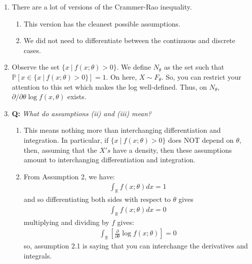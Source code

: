 \documentclass[11pt]{scrartcl}
\newcommand{\R}[0]{\mathbb{R}}
\theoremstyle{definition}
\theoremstyle{remark}
\newcommand{\pr}[1]{\mathbb{P}[#1]}
\newcommand{\idx}[2]{\int_{#1}^{#2}}
\begin{document}
\begin{enumerate}[noitemsep]
	\item There are a lot of versions of the Crammer-Rao inequality. 
	\begin{enumerate}[noitemsep]
		\item This version has the cleanest possible assumptions. 
		\item We did not need to differentiate between the continuous and discrete cases. 
	\end{enumerate}
	\item Observe the set $\{ x\ |\ f(x; \theta) > 0 \}$. We define $N_\theta$ as the set such that $\pr{ x \in \{ x\ |\ f(x; \theta) > 0 \}} = 1$. On here, $X \sim F_\theta$. So, you can restrict your attention to this set which makes the log well-defined. Thus, on $N_\theta$, $\partial / \partial \theta \log f(x, \theta)$ exists. 
	\item \textbf{Q:} \emph{ What do assumptions (ii) and (iii) mean? } 
	\begin{enumerate}[noitemsep]
		\item This means nothing more than interchanging differentiation and integration. In particular, if $\{ x\ |\ f(x; \theta) > 0 \}$ does NOT depend on $\theta$, then, assuming that the $X's$ have a density, then these assumptions amount to interchanging differentiation and integration. 
		\item From Assumption 2, we have: 
		\begin{align*}
			\idx{\R}{} f(x; \theta)dx = 1 	
		\end{align*}
		and so differentiating both sides with respect to $\theta$ gives
		\begin{align*}
			\idx{\R}{} f(x; \theta) dx = 0 	
		\end{align*}
		multiplying and dividing by $f$ gives: 
		\begin{align*}
			\idx{\R}{} \left[ \frac{\partial}{\partial \theta} \log f(x;  \theta) 	 	\right] 	= 0 
		\end{align*}
			so, assumption 2.1 is saying that you can interchange the derivatives and integrals. 
	\end{enumerate}
\end{enumerate}	
\end{document}
